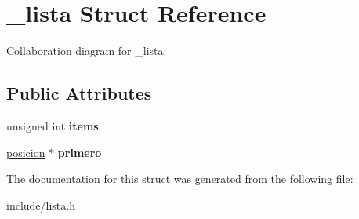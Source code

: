 \hypertarget{struct__lista}{}\section{\+\_\+lista Struct Reference}
\label{struct__lista}


Collaboration diagram for \+\_\+lista\+:
\subsection*{Public Attributes}
\begin{DoxyCompactItemize}
\item 
\mbox{\label{struct__lista_a26fe5dc3aa72ab50940eed96820507ec}} 
unsigned int {\bfseries items}
\item 
\mbox{\label{struct__lista_a9081b97734a0a2cb45e306d4d5eb5db0}} 
\hyperlink{struct__posicion}{posicion} $\ast$ {\bfseries primero}
\end{DoxyCompactItemize}


The documentation for this struct was generated from the following file\+:\begin{DoxyCompactItemize}
\item 
include/lista.\+h\end{DoxyCompactItemize}
